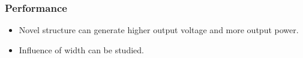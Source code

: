 \documentclass[compress]{beamer}
\begin{document}
\begin{frame}\frametitle{Performance}
\begin{exampleblock}{}
   \begin{itemize}[label=$\bullet$, font=\small, leftmargin=*]
	\item Novel structure can generate higher output voltage and more output power.
	\item Influence of width can be studied.
	\end{itemize}
	\end{exampleblock}
\end{frame}
\end{document}
